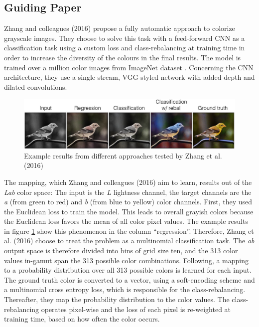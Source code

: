 \documentclass[12pt,letterpaper]{article}
\begin{document}
\subsection{Guiding Paper} 
Zhang and colleagues (2016) propose a fully automatic approach to colorize grayscale images. They choose to solve this task with a feed-forward CNN as a classification task using a custom loss and class-rebalancing at training time in order to increase the diversity of the colours in the final results. The model is trained over a million color images from ImageNet dataset \citep{Russakovsky.2014}. Concerning the CNN architecture, they use a single stream, VGG-styled network with added depth and dilated convolutions.\\
\begin{figure}[h]
	\centering
	\includegraphics[width=1.0\textwidth]{zhang_pre.jpg}
	\caption{Example results from different approaches tested by Zhang et al. (2016)}
	\label{zhangpred}
\end{figure}
The mapping, which Zhang and colleagues (2016) aim to learn, results out of the \emph{Lab} color space: The input is the \emph{L} lightness channel, the target channels are the \emph{a} (from green to red) and \emph{b} (from blue to yellow) color channels. First, they used the Euclidean loss to train the model. This leads to overall grayish colors because the Euclidean loss favors the mean of all color pixel values. The example results in figure \ref{zhangpred} show this phenomenon in the column \enquote{regression}. Therefore, Zhang et al. (2016) choose to treat the problem as a multinomial classification task. The \emph{ab} output space is therefore divided into bins of grid size ten, and the 313 color values in-gamut span the 313 possible color combinations. Following, a mapping to a probability distribution over all 313 possible colors is learned for each input. The ground truth color is converted to a vector, using a soft-encoding scheme and a multinomial cross entropy loss, which is responsible for the class-rebalancing. Thereafter, they map the probability distribution to the color values. The class-rebalancing operates pixel-wise and the loss of each pixel is re-weighted at training time, based on how often the color occurs.
\end{document}
